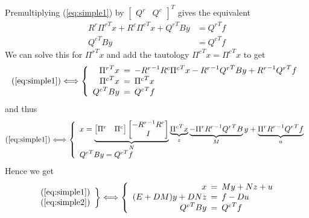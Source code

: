 \documentclass[]{article}
\newcommand{\BIN}{\begin{bmatrix}}
\newcommand{\BOUT}{\end{bmatrix}}
\begin{document}
Premultiplying (\ref{eq:simple1}) by $\BIN Q^r & Q^c \BOUT^T$ gives the equivalent
\begin{align}
  R^r {\Pi^r}^T x + R^c {\Pi^c}^T x + {Q^r}^T B y &= {Q^r}^T f \\
	{Q^c}^T B y &= {Q^c}^T f
\end{align}
We can solve this for ${\Pi^r}^T x$ and add the tautology ${\Pi^c}^T x = {\Pi^c}^T x$ to get
\begin{equation}
	\mathrm{(\ref{eq:simple1})} \Longleftrightarrow \left\{\begin{array}{rcl}
	{\Pi^r}^T x \hspace{-5pt}&=&\hspace{-5pt} -{R^r}^{-1} R^c {\Pi^c}^T x - {R^r}^{-1} {Q^r}^T B y + {R^r}^{-1} {Q^r}^T f\\
	{\Pi^c}^T x \hspace{-5pt}&=&\hspace{-5pt} {\Pi^c}^T x\\
	{Q^c}^T B y \hspace{-5pt}&=&\hspace{-5pt} {Q^c}^T f
	\end{array}\right.
\end{equation}
and thus 
\begin{equation*}
	\mathrm{(\ref{eq:simple1})} \Longleftrightarrow \left\{\begin{array}{l}
	x =\underbrace{\BIN \Pi^r & \Pi^c \BOUT \BIN -{R^r}^{-1} R^c \\ I \BOUT}_{N}
	                                \underbrace{{\Pi^c}^T x}_{z} 
															  \underbrace{- {\Pi^r} {R^r}^{-1} {Q^r}^T B}_M y + \underbrace{\Pi^r {R^r}^{-1} {Q^r}^T f}_u\\
	{Q^c}^T B y = {Q^c}^T f
	\end{array}\right.
\end{equation*}
Hence we get
\begin{equation*}
  \left. \begin{array}{c} (\ref{eq:simple1}) \\ (\ref{eq:simple2}) \end{array} \right\}
	\Longleftrightarrow
	\left\{ \begin{array}{rcl}
	x \hspace{-5pt}&=&\hspace{-5pt} M y + N z + u \\
	(E + D M) y + D N z \hspace{-5pt}&=&\hspace{-5pt} f - D u \\
	{Q^c}^T B y \hspace{-5pt}&=&\hspace{-5pt} {Q^c}^T f
	\end{array} \right.
\end{equation*}
\end{document}
